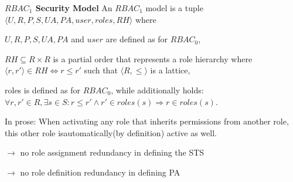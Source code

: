 \documentclass[a4paper]{article}
\renewcommand{\note}[2]{\begin{noteBox} \textbf{#1} #2 \end{noteBox}}
\begin{document}
\begin{multicols}{3}
    \note{$RBAC_1$ Security Model}{An $RBAC_1$ model is a tuple $⟨U,R,P,S,UA,PA,user,roles,RH⟩$ where
        \begin{itemize*}
            \item $U,R,P,S,UA,PA$ and $user$ are defined as for $RBAC_0$,
            \item $RH\subseteq R\times R$ is a partial order that represents a role hierarchy where $⟨r,r'⟩\in RH\Leftrightarrow r\leq r'$ such that $⟨R,\leq⟩$ is a lattice,
            \item roles is defined as for $RBAC_0$, while additionally holds: $\forall r,r'\in R,\exists s\in S:r\leq r'\wedge r'\in roles(s)\Rightarrow r\in roles(s)$.
        \end{itemize*}
    }

    In prose: When activating any role that inherits permissions from another role, this other role isautomatically(by definition) active as well.
    \begin{itemize*}
        \item $\rightarrow$ no role assignment redundancy in defining the STS
        \item $\rightarrow$ no role definition redundancy in defining PA
    \end{itemize*}



\end{multicols}
\end{document}
